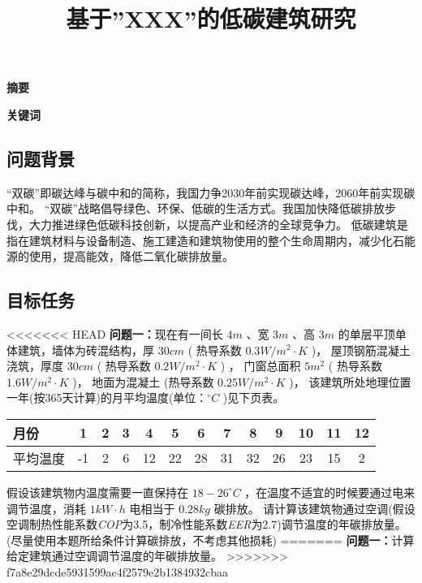 \documentclass[a4paper, 12pt]{article}
\numberwithin{equation}{section}
\begin{document}
    \title{基于''XXX''的低碳建筑研究}
    \author{}
    \date{}
    \maketitle

    \centerline{\textbf{\LARGE{摘要}}}

    \textbf{\large{关键词}}

    {}
        \subsection{问题背景}
        “双碳”即碳达峰与碳中和的简称，我国力争2030年前实现碳达峰，2060年前实现碳中和。
        “双碳”战略倡导绿色、环保、低碳的生活方式。我国加快降低碳排放步伐，大力推进绿色低碳科技创新，以提高产业和经济的全球竞争力。
        低碳建筑是指在建筑材料与设备制造、施工建造和建筑物使用的整个生命周期内，减少化石能源的使用，提高能效，降低二氧化碳排放量。

        \subsection{目标任务}
<<<<<<< HEAD
            \textbf{问题一：}现在有一间长 $ 4 m $ 、宽 $ 3 m $ 、高 $ 3 m $ 的单层平顶单体建筑，墙体为砖混结构，厚 $ 30 cm $ ( 热导系数 $ 0.3 W / m^{2} \cdot K $ )，
            屋顶钢筋混凝土浇筑，厚度 $ 30 cm $ ( 热导系数 $ 0.2 W / m^{2} \cdot K $ ) ，
            门窗总面积 $ 5 m^{2} $ ( 热导系数 $ 1.6 W / m^{2} \cdot K $ )，
            地面为混凝土 (热导系数 $ 0.25 W / m^{2} \cdot K $ )，
            该建筑所处地理位置一年(按365天计算)的月平均温度(单位：$ ^{\circ} C $ )见下页表。 \\
            \begin{table}
                \centering
                \begin{tabular}{|l|c|c|c|c|c|c|c|c|c|c|c|c|} \hline
                    月份 & 1 & 2 & 3 & 4 & 5 & 6 & 7 & 8 & 9 & 10 & 11 & 12 \\ \hline
                    平均温度 & -1 & 2 & 6 & 12 & 22 & 28 & 31 & 32 & 26 & 23 & 15 & 2\\ \hline
                \end{tabular}
            \end{table}
            假设该建筑物内温度需要一直保持在 $ 18 - 26 ^{\circ}C $ ，在温度不适宜的时候要通过电来调节温度，消耗 $ 1 kW \cdot h $ 电相当于 $ 0.28kg $ 碳排放。
            请计算该建筑物通过空调(假设空调制热性能系数\textit{COP}为3.5，制冷性能系数\textit{EER}为2.7)调节温度的年碳排放量。
            (尽量使用本题所给条件计算碳排放，不考虑其他损耗)
=======
            \textbf{问题一：}计算给定建筑通过空调调节温度的年碳排放量。
>>>>>>> f7a8e29dcde5931599ac4f2579e2b1384932cbaa
\end{document}
